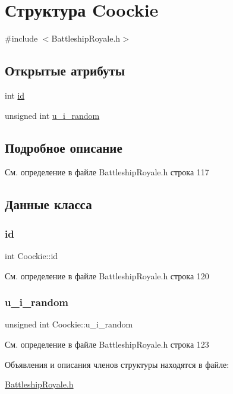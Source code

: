 \hypertarget{struct_coockie}{}\section{Структура Coockie}
\label{struct_coockie}


{\ttfamily \#include $<$Battleship\+Royale.\+h$>$}

\subsection*{Открытые атрибуты}
\begin{DoxyCompactItemize}
\item 
int \mbox{\hyperlink{struct_coockie_af7f9283a949f25c677a061ae6a46cb76}{id}}
\item 
unsigned int \mbox{\hyperlink{struct_coockie_a25293cd2b76e85993318e02e9398bdfb}{u\+\_\+i\+\_\+random}}
\end{DoxyCompactItemize}


\subsection{Подробное описание}


См. определение в файле Battleship\+Royale.\+h строка 117



\subsection{Данные класса}
\mbox{\label{struct_coockie_af7f9283a949f25c677a061ae6a46cb76}} 
\subsubsection{\texorpdfstring{id}{id}}
{\footnotesize\ttfamily int Coockie\+::id}



См. определение в файле Battleship\+Royale.\+h строка 120

\mbox{\label{struct_coockie_a25293cd2b76e85993318e02e9398bdfb}} 
\subsubsection{\texorpdfstring{u\_i\_random}{u\_i\_random}}
{\footnotesize\ttfamily unsigned int Coockie\+::u\+\_\+i\+\_\+random}



См. определение в файле Battleship\+Royale.\+h строка 123



Объявления и описания членов структуры находятся в файле\+:\begin{DoxyCompactItemize}
\item 
\mbox{\hyperlink{_battleship_royale_8h}{Battleship\+Royale.\+h}}\end{DoxyCompactItemize}
